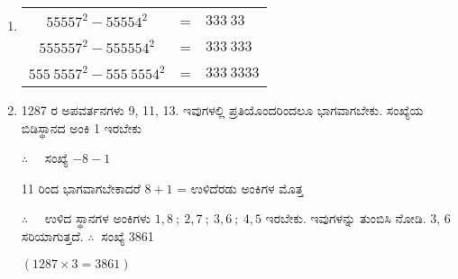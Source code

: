 \begin{enumerate}
\item 
\begin{tabular}[t]{ccl}
$55557^{2} - 55554^{2}$ & = & $333~33$\\
$555557^{2} - 555554^{2}$ & = & $333~333$\\
$555~5557^{2} - 555~5554^{2}$ & = & $333~3333$
\end{tabular}

\item 1287 ರ ಅಪವರ್ತನಗಳು 9, 11, 13. ಇವುಗಳಲ್ಲಿ ಪ್ರತಿಯೊಂದರಿಂದಲೂ ಭಾಗವಾಗಬೇಕು. ಸಂಖ್ಯೆಯ ಬಿಡಿಸ್ಥಾನದ ಅಂಕಿ 1 ಇರಬೇಕು 

$\therefore\quad$ ಸಂಖ್ಯೆ  $ - 8 - 1$

11 ರಿಂದ ಭಾಗವಾಗಬೇಕಾದರೆ $8 + 1$ = ಉಳಿದೆರಡು ಅಂಕಿಗಳ ಮೊತ್ತ 

$\therefore\quad$ ಉಳಿದ ಸ್ಥಾನಗಳ ಅಂಕಿಗಳು $1, 8 ~;~ 2, 7 ~;~ 3, 6 ~;~ 4, 5$ ಇರಬೇಕು. ಇವುಗಳನ್ನು ತುಂಬಿಸಿ ನೋಡಿ. 3, 6 ಸರಿಯಾಗುತ್ತದೆ. $\therefore~$ ಸಂಖ್ಯೆ 3861

$(1287\times 3 = 3861)$
\end{enumerate}
